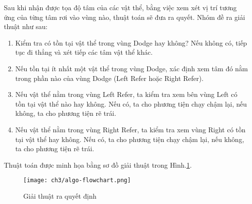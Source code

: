 Sau khi nhận được tọa độ tâm của các vật thể, bằng việc xem xét vị trí tương ứng của từng tâm rơi vào vùng nào, thuật toán sẽ đưa ra quyết. Nhóm đề ra giải thuật như sau:

	\begin{enumerate}
		\item Kiểm tra có tồn tại vật thể trong vùng Dodge hay không? Nếu không có, tiếp tục đi thẳng và xét tiếp các tâm vật thể khác.
		\item Nếu tồn tại ít nhất một vật thể trong vùng Dodge, xác định xem tâm đó nằm trong phần nào của vùng Dodge (Left Refer hoặc Right Refer).
		\item Nếu vật thể nằm trong vùng Left Refer, ta kiểm tra xem bên vùng Left có tồn tại vật thể nào hay không. Nếu có, ta cho phương tiện chạy chậm lại, nếu không, ta cho phương tiện rẽ trái.
		\item Nếu vật thể nằm trong vùng Right Refer, ta kiểm tra xem vùng Right có tồn tại vật thể hay không. Nếu có, ta cho phương tiện chạy chậm lại, nếu không, ta cho phương tiện rẽ trái.	
	\end{enumerate}
Thuật toán được minh họa bằng sơ đồ giải thuật trong Hình.\ref{fig:flowchart}.

		\begin{figure}[h]
 		\label{fig:flowchart}
		\begin{center}
		\texttt{[image: ch3/algo-flowchart.png]} %
		\caption{Giải thuật ra quyết định}
		\end{center}
		\end{figure}	

\newpage